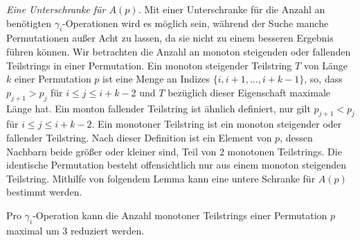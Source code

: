\documentclass[a4paper, 10pt, ngerman]{article}
\begin{document}
\emph{Eine Unterschranke für $A(p)$.} Mit einer Unterschranke für die Anzahl an benötigten $\gamma_i$-Operationen wird es möglich sein, während der Suche manche Permutationen außer Acht zu lassen, da sie nicht zu einem besseren Ergebnis führen können. Wir betrachten die Anzahl an monoton steigenden oder fallenden Teilstrings in einer Permutation. Ein monoton steigender Teilstring $T$ von Länge $k$ einer Permutation $p$ ist eine Menge an Indizes $\{i, i + 1, \dots, i + k - 1\}$, so, dass $p_{j+1} > p_j$ für $i \le j \le i+ k - 2$ und $T$ bezüglich dieser Eigenschaft maximale Länge hat. Ein monton fallender Teilstring ist ähnlich definiert, nur gilt $p_{j + 1} < p_j$ für $i \le j \le i + k - 2$. Ein monotoner Teilstring ist ein monoton steigender oder fallender Teilstring. Nach dieser Definition ist ein Element von $p$, dessen Nachbarn beide größer oder kleiner sind, Teil von 2 monotonen Teilstrings. Die identische Permutation besteht offensichtlich nur aus einem monoton steigenden Teilstring. Mithilfe von folgendem Lemma kann eine untere Schranke für $A(p)$ bestimmt werden.

\begin{lemma}
    Pro $\gamma_i$-Operation kann die Anzahl monotoner Teilstrings einer Permutation $p$ maximal um 3 reduziert werden.
\end{lemma}
\end{document}
